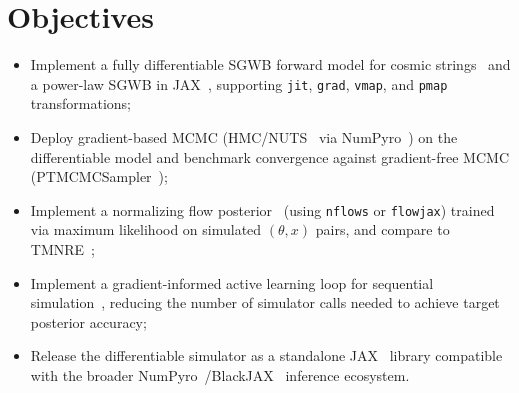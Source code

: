 \section{Objectives}\label{sec:5-objectives}
\begin{itemize}
    \item Implement a fully differentiable SGWB forward model for cosmic strings~\cite{martins_extending_2002,blanco-pillado_number_2014} and a power-law SGWB in JAX~\cite{bradbury_jax_2018}, supporting \texttt{jit}, \texttt{grad}, \texttt{vmap}, and \texttt{pmap} transformations;
    \item Deploy gradient-based MCMC (HMC/NUTS~\cite{hoffman_nuts_2014} via NumPyro~\cite{phan_composable_2019}) on the differentiable model and benchmark convergence against gradient-free MCMC (PTMCMCSampler~\cite{ellis_enterprise_2020});
    \item Implement a normalizing flow posterior~\cite{papamakarios_normalizing_2021} (using \texttt{nflows} or \texttt{flowjax}) trained via maximum likelihood on simulated $(\theta, x)$ pairs, and compare to TMNRE~\cite{miller_truncated_2021};
    \item Implement a gradient-informed active learning loop for sequential simulation~\cite{cranmer_frontier_2020}, reducing the number of simulator calls needed to achieve target posterior accuracy;
    \item Release the differentiable simulator as a standalone JAX~\cite{bradbury_jax_2018} library compatible with the broader NumPyro~\cite{phan_composable_2019}/BlackJAX~\cite{cabezas_blackjax_2024} inference ecosystem.
\end{itemize}


